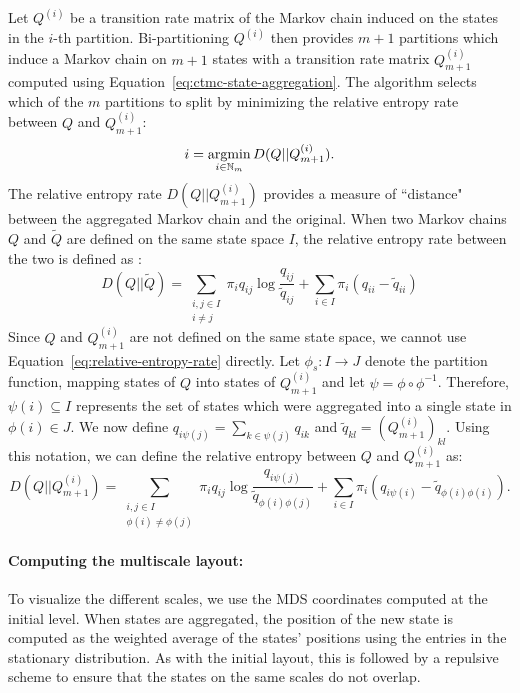  Let $Q^{(i)}$ be a transition rate matrix of the Markov chain induced on the states in the $i$-th partition. Bi-partitioning $Q^{(i)}$ then provides $m+1$ partitions which induce a Markov chain on $m+1$ states with a transition rate matrix $Q_{m+1}^{(i)}$ computed using Equation~\ref{eq:ctmc-state-aggregation}. The algorithm selects which of the $m$ partitions to split by minimizing the relative entropy rate between $Q$ and $Q_{m+1}^{(i)}$:
\begin{equation}
	i = \argmin\limits_{i \in \mathbb{N}_m} D(Q || Q_{m+1}^{(i)}).
\end{equation}
The relative entropy rate $D(Q || Q_{m+1}^{(i)})$ provides a measure of ``distance" between the aggregated Markov chain and the original. When two Markov chains $Q$ and $\tilde{Q}$ are defined on the same state space $I$, the relative entropy rate between the two is defined as \cite{EJP374}:
\begin{equation}
	\label{eq:relative-entropy-rate}
	D(Q || \tilde{Q}) = \sum\limits_{\substack{i,j \in I \\ i \neq j}}\pi_i q_{ij} \log\frac{q_{ij}}{\tilde{q}_{ij}} + \sum\limits_{i \in I}\pi_i(q_{ii} - \tilde{q}_{ii})
\end{equation}
Since $Q$ and $Q_{m+1}^{(i)}$ are not defined on the same state space, we cannot use Equation~\ref{eq:relative-entropy-rate} directly. Let $\phi_s: I \rightarrow J$ denote the partition function, mapping states of $Q$ into states of $Q_{m+1}^{(i)}$ and let $\psi = \phi \circ \phi^{-1}$. Therefore, $\psi(i) \subseteq I$  represents the set of states which were aggregated into a single state in $\phi(i) \in J$. We now define $q_{i\psi(j)} = \sum_{k \in \psi(j)}q_{ik}$ and $\tilde{q}_{kl} = \left(Q_{m+1}^{(i)}\right)_{kl}$. Using this notation, we can define the relative entropy between $Q$ and $Q_{m+1}^{(i)}$ as:
\begin{equation}
	\nonumber
	D(Q || Q_{m+1}^{(i)}) = \sum\limits_{\substack{i,j \in I \\ \phi(i) \neq \phi(j)}}\pi_i q_{ij}\log\frac{q_{i\psi(j)}}{\tilde{q}_{\phi(i)\phi(j)}} + \sum\limits_{i \in I}\pi_i \left(q_{i\psi(i)} - \tilde{q}_{\phi(i)\phi(i)}\right).
\end{equation}
%
\noindent \paragraph{\bf Computing the multiscale layout:}
To visualize the different scales, we use the MDS coordinates computed at the initial level. When states are aggregated, the position of the new state is computed as the weighted average of the states' positions using the entries in the stationary distribution. As with the initial layout, this is followed by a repulsive scheme to ensure that the states on the same scales do not overlap.



